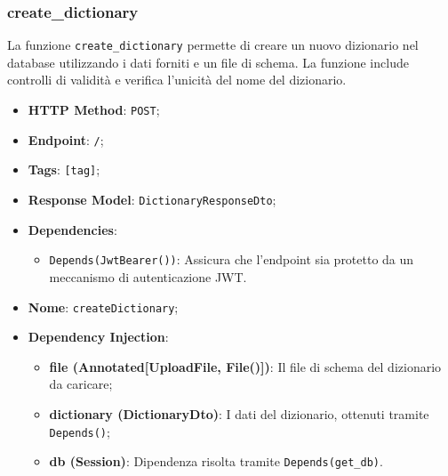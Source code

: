 \subsubsection{create\_dictionary}

\par La funzione \texttt{create\_dictionary} permette di creare un nuovo dizionario nel database utilizzando i dati forniti e un file di schema. La funzione include controlli di validità e verifica l'unicità del nome del dizionario.

\begin{itemize}
 \item \textbf{HTTP Method}: \texttt{POST};
 \item \textbf{Endpoint}: \texttt{/};
 \item \textbf{Tags}: \texttt{[tag]};
 \item \textbf{Response Model}: \texttt{DictionaryResponseDto};
 \item \textbf{Dependencies}:
  \begin{itemize}
    \item \texttt{Depends(JwtBearer())}: Assicura che l'endpoint sia protetto da un meccanismo di autenticazione JWT.
  \end{itemize}
 \item \textbf{Nome}: \texttt{createDictionary};
 \item \textbf{Dependency Injection}:
  \begin{itemize}
    \item \textbf{file (Annotated[UploadFile, File()])}: Il file di schema del dizionario da caricare;
    \item \textbf{dictionary (DictionaryDto)}: I dati del dizionario, ottenuti tramite \texttt{Depends()};
    \item \textbf{db (Session)}: Dipendenza risolta tramite \texttt{Depends(get\_db)}.
  \end{itemize}
\end{itemize}

